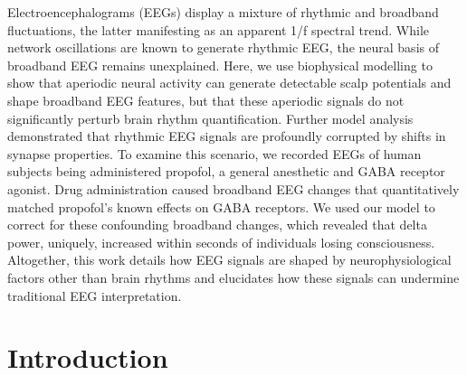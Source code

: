 Electroencephalograms (EEGs) display a mixture of rhythmic and broadband fluctuations, the latter manifesting as an apparent 1/f spectral trend. While network oscillations are known to generate rhythmic EEG, the neural basis of broadband EEG remains unexplained. Here, we use biophysical modelling to show that aperiodic neural activity can generate detectable scalp potentials and shape broadband EEG features, but that these aperiodic signals do not significantly perturb brain rhythm quantification. Further model analysis demonstrated that rhythmic EEG signals are profoundly corrupted by shifts in synapse properties. To examine this scenario, we recorded EEGs of human subjects being administered propofol, a general anesthetic and GABA receptor agonist. Drug administration caused broadband EEG changes that quantitatively matched propofol’s known effects on GABA receptors. We used our model to correct for these confounding broadband changes, which revealed that delta power, uniquely, increased within seconds of individuals losing consciousness. Altogether, this work details how EEG signals are shaped by neurophysiological factors other than brain rhythms and elucidates how these signals can undermine traditional EEG interpretation.

\section{Introduction}

